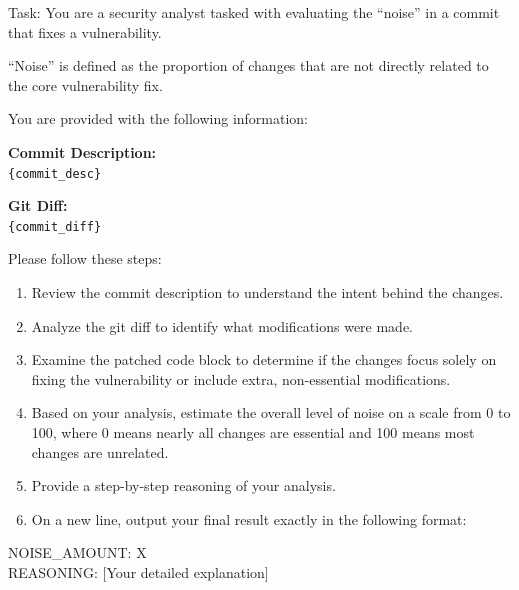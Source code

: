 \documentclass[sigconf,review,anonymous]{acmart}
\begin{document}
\begin{tcolorbox}[colback=white, colframe=black, title=Noise Evaluation Prompt]
Task: You are a security analyst tasked with evaluating the ``noise'' in a commit that fixes a vulnerability.

``Noise'' is defined as the proportion of changes that are not directly related to the core vulnerability fix.

You are provided with the following information:

\textbf{Commit Description:} \\
\verb|{commit_desc}|

\textbf{Git Diff:} \\
\verb|{commit_diff}|

Please follow these steps:

\begin{enumerate}
    \item Review the commit description to understand the intent behind the changes.
    \item Analyze the git diff to identify what modifications were made.
    \item Examine the patched code block to determine if the changes focus solely on fixing the vulnerability or include extra, non-essential modifications.
    \item Based on your analysis, estimate the overall level of noise on a scale from 0 to 100, where 0 means nearly all changes are essential and 100 means most changes are unrelated.
    \item Provide a step-by-step reasoning of your analysis.
    \item On a new line, output your final result exactly in the following format:
\end{enumerate}

NOISE\_AMOUNT: X \\
REASONING: [Your detailed explanation]
\end{tcolorbox}

\end{document}
